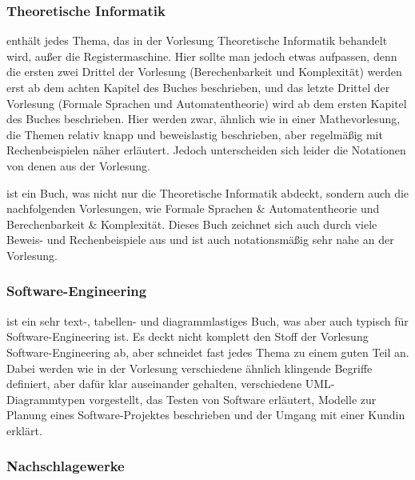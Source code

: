 \subsubsection{Theoretische Informatik}
\begin{description}[style=unboxed]
\item[Vossen, Witt: Grundkurs Theoretische Informatik]{
	enthält jedes Thema, das in der Vorlesung Theoretische Informatik behandelt wird, außer die Registermaschine. Hier sollte man jedoch etwas aufpassen, denn die ersten zwei Drittel der Vorlesung (Berechenbarkeit und Komplexität) werden erst ab dem achten Kapitel des Buches beschrieben, und das letzte Drittel der Vorlesung (Formale Sprachen und Automatentheorie) wird ab dem ersten Kapitel des Buches beschrieben. Hier werden zwar, ähnlich wie in einer Mathevorlesung, die Themen relativ knapp und beweislastig beschrieben, aber regelmäßig mit Rechenbeispielen näher erläutert. Jedoch unterscheiden sich leider die Notationen von denen aus der Vorlesung.}

\item[Cohen: Introduction to Computer Theory]{ 
	ist ein Buch, was nicht nur die Theoretische Informatik abdeckt, sondern auch die nachfolgenden Vorlesungen, wie Formale Sprachen \& Automatentheorie und Berechenbarkeit \& Komplexität. Dieses Buch zeichnet sich auch durch viele Beweis- und Rechenbeispiele aus und ist auch notationsmäßig sehr nahe an der Vorlesung.}
\end{description}

\subsubsection{Software-Engineering}
\begin{description}[style=unboxed]
\item[Sommerville: Software Engineering]{
	ist ein sehr text-, tabellen- und diagrammlastiges Buch, was aber auch typisch für Software-Engineering ist. Es deckt nicht komplett den Stoff der Vorlesung Software-Engineering ab, aber schneidet fast jedes Thema zu einem guten Teil an. Dabei werden wie in der Vorlesung verschiedene ähnlich klingende Begriffe definiert, aber dafür klar auseinander gehalten, verschiedene UML-Diagrammtypen vorgestellt, das Testen von Software erläutert, Modelle zur Planung eines Software-Projektes beschrieben und der Umgang mit einer Kundin erklärt.}
\end{description}

\subsubsection{Nachschlagewerke}

